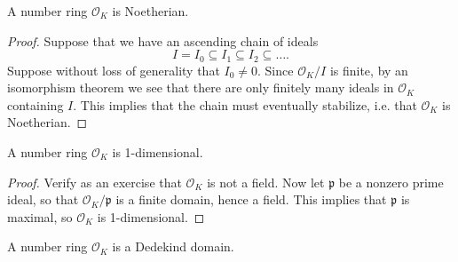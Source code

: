 \begin{corollary}
  A number ring $\mathcal{O}_K$ is Noetherian.
\end{corollary}

\begin{proof}
  Suppose that we have an ascending chain of ideals
  \[
    I = I_0 \subseteq I_1 \subseteq I_2 \subseteq \dots.
  \]
  Suppose without loss of generality that $I_0 \ne 0$.
  Since $\mathcal{O}_K / I$ is finite, by an isomorphism
  theorem we see that there are only finitely many ideals
  in $\mathcal{O}_K$ containing $I$. This implies that
  the chain must eventually stabilize, i.e. that
  $\mathcal{O}_K$ is Noetherian.
\end{proof}

\begin{corollary}
  A number ring $\mathcal{O}_K$ is 1-dimensional.
\end{corollary}

\begin{proof}
  Verify as an exercise that $\mathcal{O}_K$ is not
  a field.
  Now let $\mathfrak{p}$ be a nonzero prime ideal,
  so that
  $\mathcal{O}_K / \mathfrak{p}$ is a finite domain,
  hence a field. This implies that $\mathfrak{p}$ is
  maximal, so $\mathcal{O}_K$ is 1-dimensional.
\end{proof}

\begin{theorem}
  A number ring $\mathcal{O}_K$ is a Dedekind domain.
\end{theorem}
